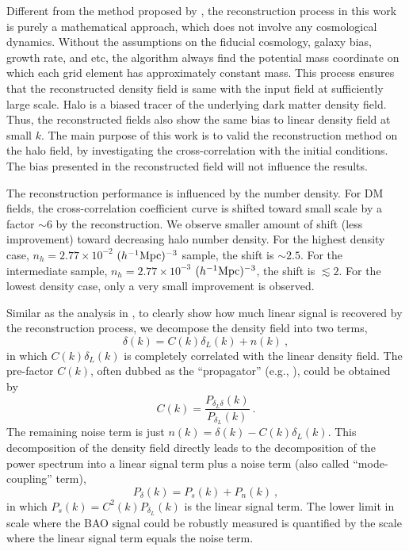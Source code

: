 \documentclass[iop]{emulateapj}
\newcommand{\be}{\begin{equation}}
\newcommand{\ee}{\end{equation}}
\newcommand{\mpch}{h^{-1} {\rm Mpc}}
\begin{document}
{Different from the method proposed by \cite{Eisenstein07},
the reconstruction process in this work is purely a mathematical approach, 
which does not involve any cosmological dynamics.
Without the assumptions on the fiducial cosmology, galaxy bias, growth rate, and etc,
the algorithm always find the potential mass coordinate on which each grid element has approximately constant mass.
This process ensures that the reconstructed density field is same with the input field at sufficiently large scale.
Halo is a biased tracer of the underlying dark matter density field.
Thus, the reconstructed fields also show the same bias to linear density field at small $k$.
The main purpose of this work is to valid the reconstruction method on the halo field, by investigating the cross-correlation with the initial conditions.
The bias presented in the reconstructed field will not influence the results.

The reconstruction performance is influenced by the number density.
For DM fields, the cross-correlation coefficient curve is shifted toward small scale by a factor $\sim 6$ by the reconstruction.
We observe smaller amount of shift (less improvement) toward decreasing halo number density.
For the highest density case, $n_h=2.77\times 10^{-2}$ $(\mpch)^{-3}$ sample, the shift is $\sim 2.5$.
For the intermediate sample, $n_h=2.77\times 10^{-3}$ $(\mpch)^{-3}$, the shift is $\lesssim 2$.
For the lowest density case, only a very small improvement is observed.

Similar as the analysis in \cite{Seo16}, to clearly show how much linear signal is recovered by the reconstruction process,
we decompose the density field into two terms, 
\be
\delta(k)=C(k)\delta_L(k)+n(k)\ ,
\ee
in which $C(k)\delta_L(k)$ is completely correlated with the linear density field.
The pre-factor $C(k)$, often dubbed as the ``propagator'' (e.g., \cite{Crocce06,Crocce08,Matsubara08,Taruya09}), could be obtained by
\be
C(k)=\frac{P_{\delta_L\delta}(k)}{P_{\delta_L}(k)}\ .
\ee
The remaining noise term is just $n(k)=\delta(k)-C(k)\delta_L(k)$.
This decomposition of the density field directly leads to the decomposition of the power spectrum into a linear signal term plus a noise term (also called ``mode-coupling'' term),
\be
\label{eqn:powerdecom}
P_\delta(k)=P_s(k)+P_n(k)\ ,
\ee
in which $P_s(k)=C^2(k)P_{\delta_L}(k)$ is the linear signal term.
The lower limit in scale where the BAO signal could be robustly measured is quantified by the scale where the linear signal term equals the noise term.

}
\end{document}
